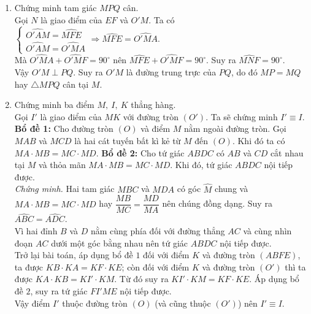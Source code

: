 \begin{ex}
{\begin{enumerate}
Từ $\widehat{AMH}=\widehat{FEM}$ do $OME$ là tam giác cân tại $O$, suy ra $\widehat{ABM}=\widehat{FEM}$.\\
Vì $\widehat{FEM}+\widehat{FEA}=180^\circ$ nên $\widehat{ABM}+\widehat{FEA}=180^\circ$. Do đó, $AEFB$ là tứ giác nội tiếp.
\item Chứng minh tam giác $MPQ$ cân.\\
Gọi $N$ là giao điểm của $EF$ và $O'M$. Ta có\\
$\begin{cases}\widehat{O'AM}=\widehat{MFE}\\ \widehat{O'AM}=\widehat{O'MA}\end{cases}\Rightarrow \widehat{MFE}=\widehat{O'MA}$.\\
Mà $\widehat{O'MA}+\widehat{O'MF}=90^\circ$ nên $\widehat{MFE}+\widehat{O'MF}=90^\circ$. Suy ra $\widehat{MNF}=90^\circ$.\\
Vậy $O'M\perp PQ$. Suy ra $O'M$ là đường trung trực của $PQ$, do đó $MP=MQ$ hay $\triangle MPQ$ cân tại $M$.
\item Chứng minh ba điểm $M,\ I,\ K$ thẳng hàng.\\
Gọi $I'$ là giao điểm của $MK$ với đường tròn $(O')$. Ta sẽ chứng minh $I'\equiv I$.\\
{\bf Bổ đề 1:} Cho đường tròn $(O)$ và điểm $M$ nằm ngoài đường tròn. Gọi $MAB$ và $MCD$ là hai cát tuyến bất kì kẻ từ $M$ đến $(O)$. Khi đó ta có $MA\cdot MB=MC\cdot MD$.
{\bf Bổ đề 2:} Cho tứ giác $ABDC$ có $AB$ và $CD$ cắt nhau tại $M$ và thỏa mãn $MA\cdot MB=MC\cdot MD$. Khi đó, tứ giác $ABDC$ nội tiếp được.\\
\textit{Chứng minh.} Hai tam giác $MBC$ và $MDA$ có góc $\widehat{M}$ chung và $MA\cdot MB=MC\cdot MD$ hay $\dfrac{MB}{MC}=\dfrac{MD}{MA}$ nên chúng đồng dạng. Suy ra $\widehat{ABC}=\widehat{ADC}$.\\
Vì hai đỉnh $B$ và $D$ nằm cùng phía đối với đường thẳng $AC$ và cùng nhìn đoạn $AC$ dưới một góc bằng nhau nên tứ giác $ABDC$ nội tiếp được.\\
Trở lại bài toán, áp dụng bổ đề $1$ đối với điểm $K$ và đường tròn $(ABFE)$, ta được $KB\cdot KA=KF\cdot KE$; còn đối với điểm $K$ và đường tròn $(O')$ thì ta được $KA\cdot KB=KI'\cdot KM$. Từ đó suy ra $KI'\cdot KM=KF\cdot KE$. Áp dụng bổ đề $2$, suy ra tứ giác $FI'ME$ nội tiếp được.\\
Vậy điểm $I'$ thuộc đường tròn $(O)$ (và cũng thuộc $(O')$) nên $I'\equiv I$.
\end{enumerate}
}
\end{ex}



